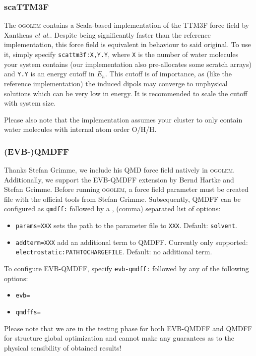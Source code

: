 \documentclass[a4paper,10pt]{scrbook}
\newcommand{\ogo}{\textsc{ogolem}}
\begin{document}
\subsubsection{scaTTM3F}
The \ogo{} contains a Scala-based implementation of the TTM3F force field by
Xantheas \emph{et al.}. Despite being significantly faster than the reference
implementation, this force field is equivalent in behaviour to said original. To
use it, simply specify \texttt{scattm3f:X,Y.Y}, where \texttt{X} is the number
of water molecules your system contains (our implementation also pre-allocates 
some
scratch arrays) and \texttt{Y.Y} is an energy cutoff in $E_h$. This cutoff is of
importance, as (like the reference implementation) the induced dipols may
converge to unphysical solutions which can be very low in energy. It is
recommended to scale the cutoff with system size.

Please also note that the implementation assumes your cluster to only contain
water molecules with internal atom order O/H/H.

\subsubsection{(EVB-)QMDFF}
Thanks Stefan Grimme, we include his QMD force field natively in \ogo{}. 
Additionally,
we support the EVB-QMDFF extension by Bernd Hartke and Stefan Grimme. Before 
running \ogo{}, a force field parameter must be created file with the 
official tools from Stefan Grimme. Subsequently, QMDFF can be configured as
\texttt{qmdff:} followed by a , (comma) separated list of options:
\begin{itemize}
 \item \texttt{params=XXX} sets the path to the parameter file to \texttt{XXX}. Default: \texttt{solvent}.
 \item \texttt{addterm=XXX} add an additional term to QMDFF. Currently only supported: \texttt{electrostatic:PATHTOCHARGEFILE}. Default: no additional term.
\end{itemize}

To configure EVB-QMDFF, specify \texttt{evb-qmdff:} followed by any of the following options:
\begin{itemize}
 \item \texttt{evb=}
 \item \texttt{qmdffs=}
\end{itemize}

Please note that we are in the testing phase for both EVB-QMDFF and QMDFF for structure global optimization and cannot make any guarantees as to the physical sensibility of obtained results!
\end{document}
